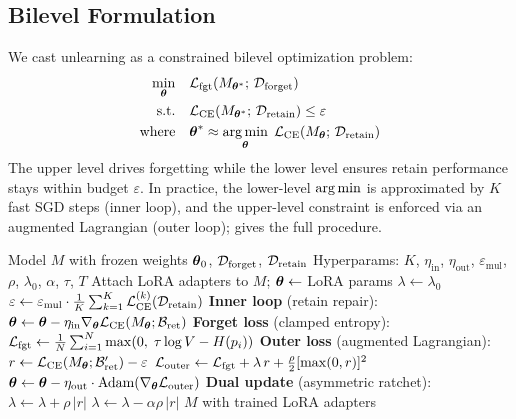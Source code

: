 \subsection{Bilevel Formulation}
\label{sec:bilevel}

We cast unlearning as a constrained bilevel optimization problem:
\begin{align}
\min_{\boldsymbol{\theta}} \quad & \mathcal{L}_{\text{fgt}}(M_{\boldsymbol{\theta}^*};\, \mathcal{D}_\text{forget}) \nonumber\\
\text{s.t.} \quad & \mathcal{L}_{\text{CE}}(M_{\boldsymbol{\theta}^*};\, \mathcal{D}_\text{retain}) \leq \varepsilon \label{eq:bilevel}\\
\text{where} \quad & \boldsymbol{\theta}^* \approx \operatorname*{arg\,min}_{\boldsymbol{\theta}}\; \mathcal{L}_{\text{CE}}(M_{\boldsymbol{\theta}};\, \mathcal{D}_\text{retain}) \nonumber
\end{align}
The upper level drives forgetting while the lower level ensures retain performance stays within budget $\varepsilon$.
In practice, the lower-level $\operatorname*{arg\,min}$ is approximated by $K$ fast SGD steps (inner loop), and the upper-level constraint is enforced via an augmented Lagrangian (outer loop);  gives the full procedure.

\begin{algorithm}[t]
\begin{nolinenumbers}
\caption{\method: Bilevel Augmented Lagrangian Unlearning}
\label{alg:lora_bial}
\begin{algorithmic}[1]
\REQUIRE Model $M$ with frozen weights $\boldsymbol{\theta}_0$, $\mathcal{D}_\text{forget}$, $\mathcal{D}_\text{retain}$
\REQUIRE Hyperparams: $K$, $\eta_{\text{in}}$, $\eta_{\text{out}}$, $\varepsilon_{\text{mul}}$, $\rho$, $\lambda_0$, $\alpha$, $\tau$, $T$
\STATE Attach LoRA adapters to $M$; $\boldsymbol{\theta} \leftarrow$ LoRA params
\STATE $\lambda \leftarrow \lambda_0$
\STATE $\varepsilon \leftarrow \varepsilon_{\text{mul}} \cdot \frac{1}{K}\sum_{k=1}^K \mathcal{L}_{\text{CE}}^{(k)}(\mathcal{D}_\text{retain})$
    \STATE \textbf{Inner loop} (retain repair):
        \STATE $\boldsymbol{\theta} \leftarrow \boldsymbol{\theta} - \eta_{\text{in}} \nabla_{\boldsymbol{\theta}} \mathcal{L}_{\text{CE}}(M_{\boldsymbol{\theta}}; \mathcal{B}_{\text{ret}})$
    \ENDFOR
    \STATE \textbf{Forget loss} (clamped entropy):
    \STATE $\mathcal{L}_{\text{fgt}} \leftarrow \frac{1}{N}\sum_{i=1}^{N} \max(0,\; \tau \log V - H(p_i))$
    \STATE \textbf{Outer loss} (augmented Lagrangian):
    \STATE $r \leftarrow \mathcal{L}_{\text{CE}}(M_{\boldsymbol{\theta}}; \mathcal{B}'_{\text{ret}}) - \varepsilon$
    \STATE $\mathcal{L}_{\text{outer}} \leftarrow \mathcal{L}_{\text{fgt}} + \lambda\, r + \frac{\rho}{2}[\max(0, r)]^2$
    \STATE $\boldsymbol{\theta} \leftarrow \boldsymbol{\theta} - \eta_{\text{out}} \cdot \text{Adam}(\nabla_{\boldsymbol{\theta}} \mathcal{L}_{\text{outer}})$
    \STATE \textbf{Dual update} (asymmetric ratchet):
        \STATE $\lambda \leftarrow \lambda + \rho \,|r|$
    \ELSE
        \STATE $\lambda \leftarrow \lambda - \alpha\rho \,|r|$
    \ENDIF
\ENDFOR
\RETURN $M$ with trained LoRA adapters
\end{algorithmic}
\end{nolinenumbers}
\end{algorithm}

